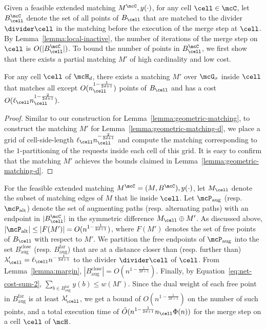 Given a feasible extended matching $M^\mcC, y(\cdot)$, for any cell $\cell\in \mcC$, let $B^\mcC_\cell$ denote the set of all points of $B_\cell$ that are matched to the divider $\divider\cell$ in the matching before the execution of the merge step at $\cell$. By Lemma~\ref{lemma:local-inactive}, the number of iterations of the merge step on $\cell$ is $O(|B^\mcC_\cell|)$.
To bound the number of points in $B^\mcC_\cell$, we first show that there exists a partial matching $M'$ of high cardinality and low cost. 
\begin{lemma}\label{lemma:geometric-matching-d}
    For any cell $\cell$ of $\mcH_d$, there exists a matching $M'$ over $\mcG_\sigma$ inside $\cell$ that matches all except $O(n_\cell^{1-\frac{1}{2d+1}})$ points of $B_\cell$ and has a cost $O(\ell_\cell n_\cell^{1-\frac{2}{2d+1}})$.
\end{lemma}
\begin{proof}
    Similar to our construction for Lemma~\ref{lemma:geometric-matching}, to construct the matching $M'$ for Lemma~\ref{lemma:geometric-matching-d}, we place a grid of cell-side-length $\ell_\cell n_\cell^{-\frac{2}{2d+1}}$ and compute the matching corresponding to the $1$-partitioning of the requests inside each cell of this grid. It is easy to confirm that the matching $M'$ achieves the bounds claimed in Lemma~\ref{lemma:geometric-matching-d}.
\end{proof}


For the feasible extended matching $M^\mcC=(M, B^\mcC), y(\cdot)$, let $M_\cell$ denote the subset of matching edges of $M$ that lie inside $\cell$. 
Let $\mcP_{\mathrm{aug}}$ (resp. $\mcP_{\mathrm{alt}}$) denote the set of augmenting paths (resp. alternating paths) with an endpoint in $|B^\mcC_\cell|$ in the symmetric difference $M_\cell\oplus M'$.
As discussed above, $|\mcP_{\mathrm{alt}}|\le |F(M')|=O(n^{1-\frac{1}{2d+1}})$, where $F(M')$ denotes the set of free points of $B_\cell$ with respect to $M'$. 
We partition the free endpoints of $\mcP_{\mathrm{aug}}$ into the set $B^{\mathrm{close}}_{\mathrm{aug}}$ (resp. $B^{\mathrm{far}}_{\mathrm{aug}}$) that are at a distance closer than (resp. further than) $\lambda'_\cell=\ell_\cell n^{-\frac{1}{2d+1}}$ to the divider $\divider\cell$ of $\cell$. From Lemma~\ref{lemma:margin},  $|B^{\mathrm{close}}_{\mathrm{aug}}|=O(n^{1-\frac{1}{2d+1}})$. Finally, by Equation~\eqref{eq:net-cost-sum-2}, $\sum_{b\in B^{\mathrm{far}}_{\mathrm{aug}}}y(b) \le w(M')$. Since the dual weight of each free point in $B^{\mathrm{far}}_{\mathrm{aug}}$ is at least $\lambda'_\cell$, we get a bound of $O(n^{1-\frac{1}{2d+1}})$ on the number of such points, and a total execution time of $\tilde{O}(n^{1-\frac{1}{2d+1}}n_\cell\Phi(n))$ for the merge step on a cell $\cell$ of $\mcH$.




